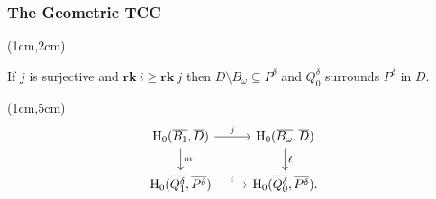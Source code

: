 \begin{frame}
  \frametitle{{\small The Geometric TCC}}

  \begin{textblock*}{11cm}(1cm,2cm)
    \begin{small}\begin{theorem}
        If $j$ is surjective and $\mathbf{rk}~i\geq \mathbf{rk}~j$ then $D\setminus B_\omega\subseteq P^\delta$ and $Q_0^\delta$ surrounds $P^\delta$ in $D$.
    \end{theorem}\end{small}
  \end{textblock*}

  \begin{textblock*}{11cm}(1cm,5cm)
    \[\begin{tikzcd}[ampersand replacement=\&]
      \hom_0(\overline{B_1},\overline{D})\arrow{d}{m} \arrow{r}{j} \&
      \hom_0(\overline{B_\omega}, \overline{D}) \arrow{d}{\ell} \\
      \hom_0(\overline{Q_1^\delta}, \overline{P^\delta}) \arrow{r}{i} \&
      \hom_0(\overline{Q_0^\delta}, \overline{P^\delta}).
    \end{tikzcd}\]
  \end{textblock*}
\end{frame}
